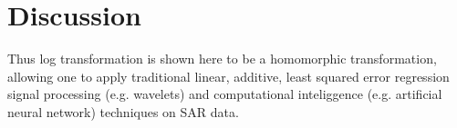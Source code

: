 
\chapter{Discussion} %



\ifpdf
    \graphicspath{{7/figures/PNG/}{7/figures/PDF/}{7/figures/}}
\else
    \graphicspath{{7/figures/EPS/}{7/figures/}}
\fi



Thus log transformation is shown here to be a homomorphic transformation, allowing one to apply traditional linear, 
additive, least squared error regression signal processing (e.g. wavelets) and computational inteliggence
(e.g. artificial neural network) techniques on SAR data.





